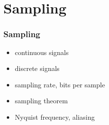 
\section{Sampling}

\begin{frame}
	\frametitle{Sampling}
	\begin{itemize}
		\item continuous signals
		\item discrete signals
		\item sampling rate, bits per sample
		\item sampling theorem
		\item Nyquist frequency, aliasing
	\end{itemize}
\end{frame}

